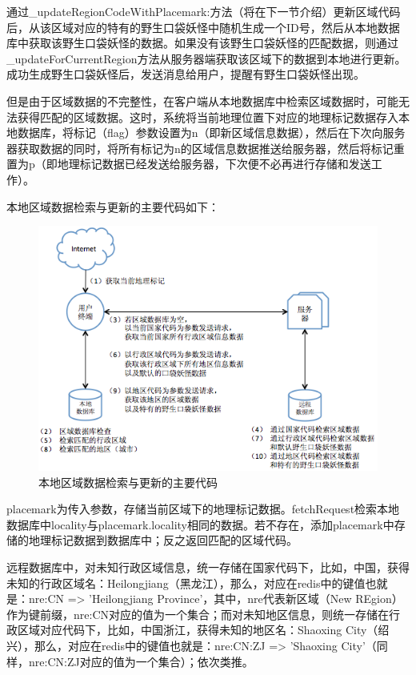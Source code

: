 \documentclass{article}
\begin{document}
\begin{CJK}{UTF8}{gbsn}
  通过\_updateRegionCodeWithPlacemark:方法（将在下一节介绍）更新区域代码后，从该区域对应的特有的野生口袋妖怪中随机生成一个ID号，然后从本地数据库中获取该野生口袋妖怪的数据。如果没有该野生口袋妖怪的匹配数据，则通过\_updateForCurrentRegion方法从服务器端获取该区域下的数据到本地进行更新。成功生成野生口袋妖怪后，发送消息给用户，提醒有野生口袋妖怪出现。

  但是由于区域数据的不完整性，在客户端从本地数据库中检索区域数据时，可能无法获得匹配的区域数据。这时，系统将当前地理位置下对应的地理标记数据存入本地数据库，将标记（flag）参数设置为n（即新区域信息数据），然后在下次向服务器获取数据的同时，将所有标记为n的区域信息数据推送给服务器，然后将标记重置为p（即地理标记数据已经发送给服务器，下次便不必再进行存储和发送工作）。

  本地区域数据检索与更新的主要代码如下：
   \begin{figure}[htbp]
		\centering
		\includegraphics[bb=0 0 749 669, scale=0.45]{figure/fig_n19.png}
		\caption{本地区域数据检索与更新的主要代码}
		\label{fig:n19}
	\end{figure}

  placemark为传入参数，存储当前区域下的地理标记数据。fetchRequest检索本地数据库中locality与placemark.locality相同的数据。若不存在，添加placemark中存储的地理标记数据到数据库中；反之返回匹配的区域代码。

  远程数据库中，对未知行政区域信息，统一存储在国家代码下，比如，中国，获得未知的行政区域名：Heilongjiang（黑龙江），那么，对应在redis中的键值也就是：nre:CN => 'Heilongjiang Province'，其中，nre代表新区域（New REgion）作为键前缀，nre:CN对应的值为一个集合；而对未知地区信息，则统一存储在行政区域对应代码下，比如，中国浙江，获得未知的地区名：Shaoxing City（绍兴），那么，对应在redis中的键值也就是：nre:CN:ZJ => 'Shaoxing City'（同样，nre:CN:ZJ对应的值为一个集合）；依次类推。


\end{CJK}
\end{document}
